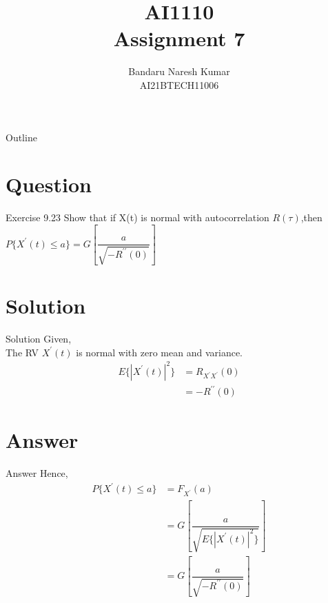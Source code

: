 \documentclass{beamer}
\title{AI1110 \\ Assignment 7}
\author{Bandaru Naresh Kumar \\ AI21BTECH11006}
\date{}
\begin{document}
	\begin{frame}
		\titlepage
	\end{frame}
	
	\begin{frame}{Outline}
    		\tableofcontents
	\end{frame}
	
	\section{Question}
	\begin{frame}{Exercise 9.23}
	Show that if X(t) is normal with autocorrelation $R(\tau)$,then\\
	$P\{X^{\prime}(t)\leq a\} = G\left[ \dfrac{a}{\sqrt{-R^{\prime\prime}(0)}}\right] $
	\end{frame}
	
	\section{Solution}
	\begin{frame}{Solution}
	    Given,\\
	    The RV $X^{\prime}(t)$ is normal with zero mean and variance.\\
	    \begin{align}
	    E\{{|X^{\prime}(t)|}^2\} &= R_{X^{\prime}X^{\prime}}(0)\\
	                             &= -R^{\prime\prime}(0)
	    \end{align}
	 \end{frame}
	 
	\section{Answer}
	\begin{frame}{Answer}
	  Hence,
	  \begin{align}
	    P\{X^{\prime}(t)\leq a\} &= F_{X^{\prime}}(a)\\
	                             &= G\left[ \dfrac{a}{\sqrt{E\{{|X^{\prime}(t)|}^2\}}}\right] \\
	                             &= G\left[ \dfrac{a}{\sqrt{-R^{\prime\prime}(0)}}\right] 
	  \end{align}
	\end{frame}
	
\end{document}
